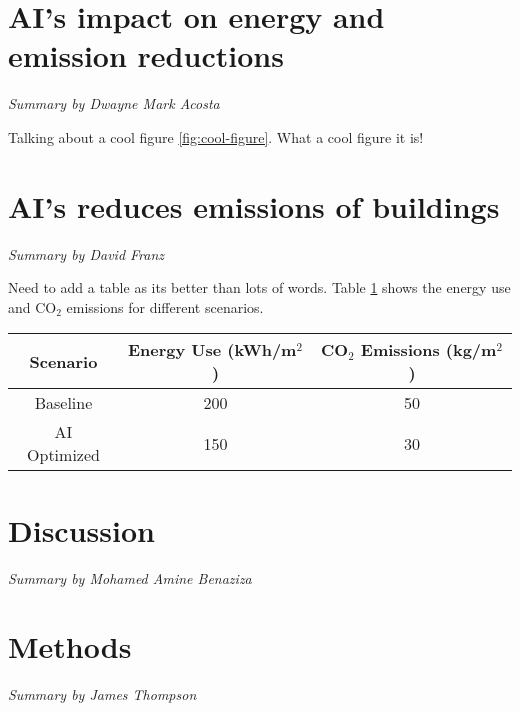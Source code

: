 \documentclass[conference,a4paper]{IEEEtran}
\begin{document}
\section*{AI's impact on energy and emission reductions}
\textit{Summary by Dwayne Mark Acosta}

Talking about a cool figure \ref{fig:cool-figure}. What a cool figure it is!


\section*{AI's reduces emissions of buildings}
\textit{Summary by David Franz}

Need to add a table as its better than lots of words. Table \ref{tab:energy-emissions} shows the energy use and CO$_2$ emissions for different scenarios.

\begin{table}
\centering
\begin{tabular}{|c|c|c|}
\hline
\textbf{Scenario} & \textbf{Energy Use (kWh/m$^2$)} & \textbf{CO$_2$ Emissions (kg/m$^2$)} \\
\hline 
Baseline & 200 & 50 \\
\hline
AI Optimized & 150 & 30 \\
\hline
\end{tabular}
\label{tab:energy-emissions}
\end{table}

\section*{Discussion}
\textit{Summary by Mohamed Amine Benaziza}

\section*{Methods}
\textit{Summary by James Thompson}




\appendix
\end{document}
